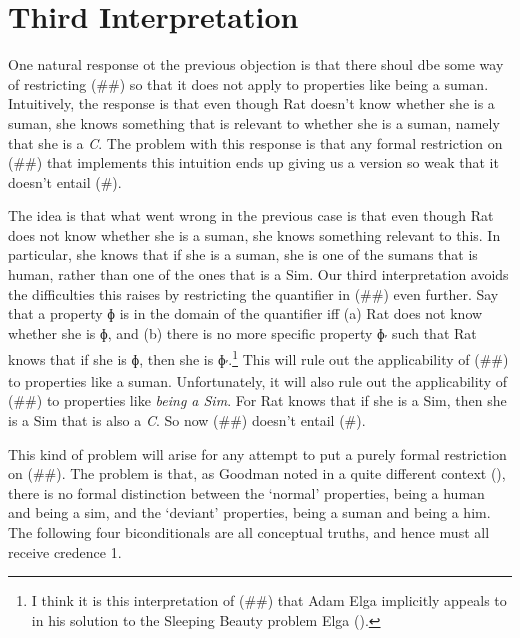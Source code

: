 \documentclass[
  10pt,
  letterpaper,
  DIV=11,
  numbers=noendperiod,
  twoside]{scrartcl}
\begin{document}
\section{Third Interpretation}\label{third-interpretation}

One natural response ot the previous objection is that there shoul dbe
some way of restricting (\#\#) so that it does not apply to properties
like being a suman. Intuitively, the response is that even though Rat
doesn't know whether she is a suman, she knows something that is
relevant to whether she is a suman, namely that she is a \emph{C}. The
problem with this response is that any formal restriction on (\#\#) that
implements this intuition ends up giving us a version so weak that it
doesn't entail (\#).

The idea is that what went wrong in the previous case is that even
though Rat does not know whether she is a suman, she knows something
relevant to this. In particular, she knows that if she is a suman, she
is one of the sumans that is human, rather than one of the ones that is
a Sim. Our third interpretation avoids the difficulties this raises by
restricting the quantifier in (\#\#) even further. Say that a property ɸ
is in the domain of the quantifier iff (a) Rat does not know whether she
is ɸ, and (b) there is no more specific property ɸ\textsubscript{′} such
that Rat knows that if she is ɸ, then she is
ɸ\textsubscript{′}.\footnote{I think it is this interpretation of (\#\#)
  that Adam Elga implicitly appeals to in his solution to the Sleeping
  Beauty problem Elga ().} This will
rule out the applicability of (\#\#) to properties like a suman.
Unfortunately, it will also rule out the applicability of (\#\#) to
properties like \emph{being a Sim}. For Rat knows that if she is a Sim,
then she is a Sim that is also a \emph{C}. So now (\#\#) doesn't entail
(\#).

This kind of problem will arise for any attempt to put a purely formal
restriction on (\#\#). The problem is that, as Goodman noted in a quite
different context (), there is
no formal distinction between the `normal' properties, being a human and
being a sim, and the `deviant' properties, being a suman and being a
him. The following four biconditionals are all conceptual truths, and
hence must all receive credence 1.
\end{document}

